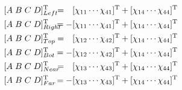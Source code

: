\documentclass[twocolumn]{article}
\begin{document}
\begin{align}
\nonumber %
&\lbrack A \hspace{3pt} B \hspace{3pt} C \hspace{3pt} D \rbrack^\mathrm{T}_{Left} \hspace{-15pt} &= \hspace{10pt}&\lbrack \chi_{11} \cdots \chi_{41} \rbrack^\mathrm{T} + \lbrack \chi_{14} \cdots \chi_{44} \rbrack^\mathrm{T}
\\
\nonumber %
&\lbrack A \hspace{3pt} B \hspace{3pt} C \hspace{3pt} D \rbrack^\mathrm{T}_{Right} \hspace{-15pt} &= -&\lbrack \chi_{11} \cdots \chi_{41} \rbrack^\mathrm{T} + \lbrack \chi_{14} \cdots \chi_{44} \rbrack^\mathrm{T}
\\
\nonumber %
&\lbrack A \hspace{3pt} B \hspace{3pt} C \hspace{3pt} D \rbrack^\mathrm{T}_{Top} \hspace{-15pt} &= \hspace{10pt}&\lbrack \chi_{12} \cdots \chi_{42} \rbrack^\mathrm{T} + \lbrack \chi_{14} \cdots \chi_{44} \rbrack^\mathrm{T}
\\
\nonumber %
&\lbrack A \hspace{3pt} B \hspace{3pt} C \hspace{3pt} D \rbrack^\mathrm{T}_{Bot} \hspace{-15pt} &= -&\lbrack \chi_{12} \cdots \chi_{42} \rbrack^\mathrm{T} + \lbrack \chi_{14} \cdots \chi_{44} \rbrack^\mathrm{T}
\\
\nonumber %
&\lbrack A \hspace{3pt} B \hspace{3pt} C \hspace{3pt} D \rbrack^\mathrm{T}_{Near} \hspace{-15pt} &= \hspace{10pt}&\lbrack \chi_{13} \cdots \chi_{43} \rbrack^\mathrm{T} + \lbrack \chi_{14} \cdots \chi_{44} \rbrack^\mathrm{T}
\\
\nonumber %
&\lbrack A \hspace{3pt} B \hspace{3pt} C \hspace{3pt} D \rbrack^\mathrm{T}_{Far} \hspace{-15pt} &= -&\lbrack \chi_{13} \cdots \chi_{43} \rbrack^\mathrm{T} + \lbrack \chi_{14} \cdots \chi_{44} \rbrack^\mathrm{T}
\\
\end{align}
\end{document}
